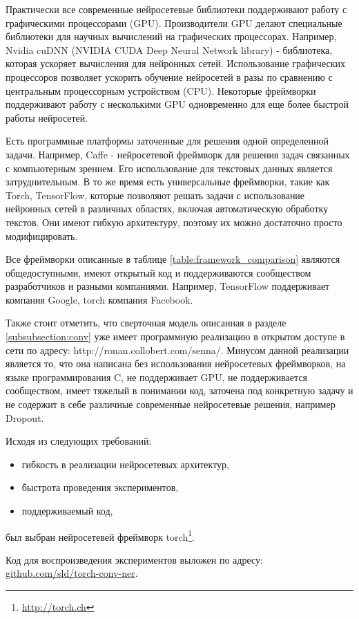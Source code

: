 Практически все современные нейросетевые библиотеки поддерживают работу
с графическими процессорами (GPU).
Производители GPU делают специальные библиотеки для научных
вычислений на графических процессорах.
Например, Nvidia cuDNN (NVIDIA CUDA Deep Neural Network library) -
библиотека, которая ускоряет вычисления для нейронных сетей.
Использование графических процессоров позволяет ускорить обучение нейросетей
в разы по сравнению с центральным процессорным устройством (CPU).
Некоторые фреймворки поддерживают работу с несколькими GPU одновременно для
еще более быстрой работы нейросетей.

Есть программные платформы заточенные для решения одной определенной задачи.
Например, Caffe - нейросетевой фреймворк для решения задач связанных с компьютерным зрением.
Его использование для текстовых данных является затруднительным.
В то же время есть универсальные фреймворки, такие как Torch, TensorFlow,
которые позволяют решать задачи с использование нейронных сетей в различных
областях, включая автоматическую обработку текстов.
Они имеют гибкую архитектуру, поэтому их можно достаточно просто модифицировать.

Все фреймворки описанные в таблице \ref{table:framework_comparison} являются
общедоступными, имеют открытый код и поддерживаются сообществом разработчиков и
разными компаниями. Например, TensorFlow поддерживает компания Google, torch
компания Facebook.

Также стоит отметить, что сверточная модель описанная в разделе \ref{subsubsection:conv}
уже имеет программную реализацию в открытом доступе в сети по адресу: http://ronan.collobert.com/senna/.
Минусом данной реализации является то, что она написана без использования
нейросетевых фреймворков, на языке программирования C, не поддерживает GPU,
не поддерживается сообществом, имеет тяжелый в понимании код, заточена под конкретную задачу
и не содержит в себе различные современные нейросетевые решения, например Dropout.

Исходя из следующих требований:
\begin{itemize}
\item гибкость в реализации нейросетевых архитектур,
\item быстрота проведения экспериментов,
\item поддерживаемый код,
\end{itemize}
был выбран нейросетевей фреймворк torch\footnote{\url{http://torch.ch}}.

Код для воспроизведения экспериментов выложен по адресу:
\href{https://github.com/sld/torch-conv-ner}{github.com/sld/torch-conv-ner}.

